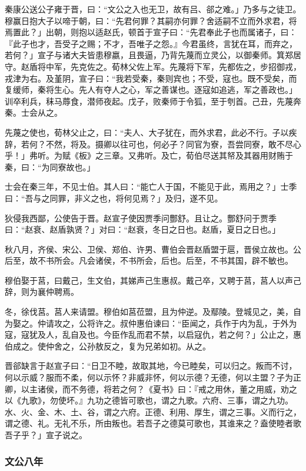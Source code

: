 \documentclass[]{article}
\begin{document}
秦康公送公子雍于晋，曰：``文公之入也无卫，故有吕、郤之难。」乃多与之徒卫。穆赢日抱大子以啼于朝，曰：``先君何罪？其嗣亦何罪？舍适嗣不立而外求君，将焉置此？」出朝，则抱以适赵氏，顿首于宣子曰：``先君奉此子也而属诸子，曰：『此子也才，吾受子之赐；不才，吾唯子之怨。』今君虽终，言犹在耳，而弃之，若何？」宣子与诸大夫皆患穆嬴，且畏逼，乃背先蔑而立灵公，以御秦师。箕郑居守。赵盾将中军，先克佐之。荀林父佐上军。先蔑将下军，先都佐之，步招御戎，戎津为右。及堇阴，宣子曰：``我若受秦，秦则宾也；不受，寇也。既不受矣，而复缓师，秦将生心。先人有夺人之心，军之善谋也。逐寇如追逃，军之善政也。」训卒利兵，秣马蓐食，潜师夜起。戊子，败秦师于令狐，至于刳首。己丑，先蔑奔秦。士会从之。

先蔑之使也，荀林父止之，曰：``夫人、大子犹在，而外求君，此必不行。子以疾辞，若何？不然，将及。摄卿以往可也，何必子？同官为寮，吾尝同寮，敢不尽心乎！」弗听。为赋《板》之三章。又弗听。及亡，荀伯尽送其帑及其器用财贿于秦，曰：``为同寮故也。」

士会在秦三年，不见士伯。其人曰：``能亡人于国，不能见于此，焉用之？」士季曰：``吾与之同罪，非义之也，将何见焉？」及归，遂不见。

狄侵我西鄙，公使告于晋。赵宣子使因贾季问酆舒。且让之。酆舒问于贾季曰：``赵衰、赵盾孰贤？」对曰：``赵衰，冬日之日也。赵盾，夏日之日也。」

秋八月，齐侯、宋公、卫侯、郑伯、许男、曹伯会晋赵盾盟于扈，晋侯立故也。公后至，故不书所会。凡会诸侯，不书所会，后也。后至，不书其国，辟不敏也。

穆伯娶于莒，曰戴己，生文伯，其娣声己生惠叔。戴己卒，又聘于莒，莒人以声己辞，则为襄仲聘焉。

冬，徐伐莒。莒人来请盟。穆伯如莒莅盟，且为仲逆。及鄢陵。登城见之，美，自为娶之。仲请攻之，公将许之。叔仲惠伯谏曰：``臣闻之，兵作于内为乱，于外为寇，寇犹及人，乱自及也。今臣作乱而君不禁，以启寇仇，若之何？」公止之，惠伯成之。使仲舍之，公孙敖反之，复为兄弟如初。从之。

晋郤缺言于赵宣子曰：``日卫不睦，故取其地，今已睦矣，可以归之。叛而不讨，何以示威？服而不柔，何以示怀？非威非怀，何以示德？无德，何以主盟？子为正卿，以主诸侯，而不务德，将若之何？《夏书》曰：『戒之用休，董之用威，劝之以《九歌》，勿使坏。』九功之德皆可歌也，谓之九歌。六府、三事，谓之九功。水、火、金、木、土、谷，谓之六府。正德、利用、厚生，谓之三事。义而行之，谓之德、礼。无礼不乐，所由叛也。若吾子之德莫可歌也，其谁来之？盍使睦者歌吾子乎？」宣子说之。

\hypertarget{header-n1138}{%
\subsubsection{文公八年}\label{header-n1138}}
\end{document}

